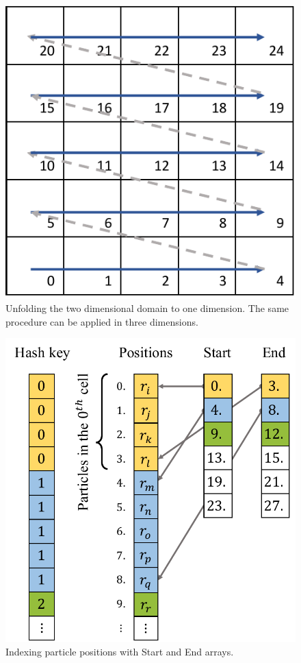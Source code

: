 \documentclass[a4paper,12pt,openany]{book}
\theoremstyle{break}
\begin{document}
\begin{figure}[h]
  \includegraphics[scale=0.6]{hash_key.pdf}
  \centering
  \caption{Unfolding the two dimensional domain to one dimension. The same procedure can be applied in three dimensions.}
  \label{fig:unfolding}
\end{figure}\vspace*{3pt}
\begin{figure}[h!]
  \includegraphics[scale=0.6]{nnsearch.pdf}
  \centering
  \caption{Indexing particle positions with Start and End arrays.}
  \label{fig:nnsearch}
\end{figure}\vspace*{3pt}
\end{document}

